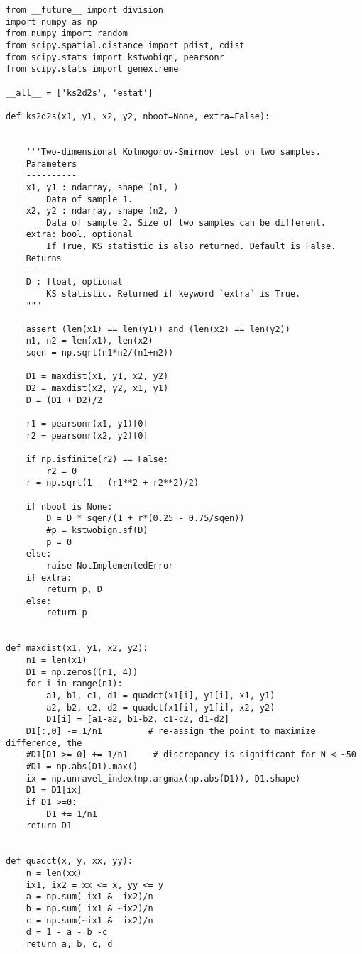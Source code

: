 \begin{lstlisting}
from __future__ import division
import numpy as np
from numpy import random
from scipy.spatial.distance import pdist, cdist
from scipy.stats import kstwobign, pearsonr
from scipy.stats import genextreme

__all__ = ['ks2d2s', 'estat']

def ks2d2s(x1, y1, x2, y2, nboot=None, extra=False):


    '''Two-dimensional Kolmogorov-Smirnov test on two samples.
    Parameters
    ----------
    x1, y1 : ndarray, shape (n1, )
        Data of sample 1.
    x2, y2 : ndarray, shape (n2, )
        Data of sample 2. Size of two samples can be different.
    extra: bool, optional
        If True, KS statistic is also returned. Default is False.
    Returns
    -------
    D : float, optional
        KS statistic. Returned if keyword `extra` is True.
	"""

    assert (len(x1) == len(y1)) and (len(x2) == len(y2))
    n1, n2 = len(x1), len(x2)
    sqen = np.sqrt(n1*n2/(n1+n2))

    D1 = maxdist(x1, y1, x2, y2)
    D2 = maxdist(x2, y2, x1, y1)
    D = (D1 + D2)/2

    r1 = pearsonr(x1, y1)[0]
    r2 = pearsonr(x2, y2)[0]

    if np.isfinite(r2) == False:
        r2 = 0
    r = np.sqrt(1 - (r1**2 + r2**2)/2)

    if nboot is None:
        D = D * sqen/(1 + r*(0.25 - 0.75/sqen))
        #p = kstwobign.sf(D)
        p = 0
    else:
        raise NotImplementedError
    if extra:
        return p, D
    else:
        return p


def maxdist(x1, y1, x2, y2):
    n1 = len(x1)
    D1 = np.zeros((n1, 4))
    for i in range(n1):
        a1, b1, c1, d1 = quadct(x1[i], y1[i], x1, y1)
        a2, b2, c2, d2 = quadct(x1[i], y1[i], x2, y2)
        D1[i] = [a1-a2, b1-b2, c1-c2, d1-d2]
    D1[:,0] -= 1/n1         # re-assign the point to maximize difference, the
    #D1[D1 >= 0] += 1/n1     # discrepancy is significant for N < ~50
    #D1 = np.abs(D1).max()
    ix = np.unravel_index(np.argmax(np.abs(D1)), D1.shape)
    D1 = D1[ix]
    if D1 >=0:
        D1 += 1/n1
    return D1


def quadct(x, y, xx, yy):
    n = len(xx)
    ix1, ix2 = xx <= x, yy <= y
    a = np.sum( ix1 &  ix2)/n
    b = np.sum( ix1 & ~ix2)/n
    c = np.sum(~ix1 &  ix2)/n
    d = 1 - a - b -c
    return a, b, c, d

\end{lstlisting}



